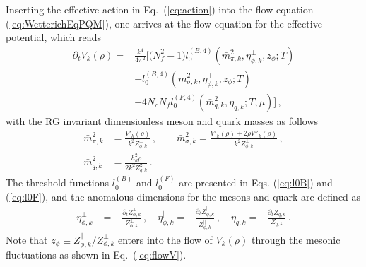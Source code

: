 \documentclass[%
reprint,
superscriptaddress,
showpacs,preprintnumbers,
 amsmath,amssymb,
 aps,
prd,
]{revtex4-1}
\def\Eq#1{Eq.~(\ref{#1})}
\def\eq#1{(\ref{#1})}
\begin{document}
Inserting the effective action in \Eq{eq:action} into the flow equation \eq{eq:WetterichEqPQM}, one arrives at the flow equation for the effective potential, which reads
\begin{align}
  \partial_t V_k(\rho)=&\frac{k^4}{4\pi^2} \bigg [\big(N^2_f-1\big) l^{(B,4)}_{0}(\bar{m}^{2}_{\pi,k},\eta^{\perp}_{\phi,k},z_\phi;T)\nonumber\\[2ex]
&+l^{(B,4)}_{0}(\bar{m}^{2}_{\sigma,k},\eta^{\perp}_{\phi,k},z_\phi;T)\nonumber\\[2ex]
&-4N_c N_f l^{(F,4)}_{0}(\bar{m}^{2}_{q,k},\eta_{q,k};T,\mu)\bigg]\,, \label{eq:flowV}
\end{align}
with the RG invariant dimensionless meson and quark masses as follows
\begin{align}
  \bar{m}^{2}_{\pi,k}&=\frac{V'_k(\rho)}{k^2Z^{\perp}_{\phi,k}}\,, \qquad \bar{m}^{2}_{\sigma,k}=\frac{V'_k(\rho)+2\rho V''_k(\rho)}{k^2 Z^{\perp}_{\phi,k}}\,,\\[2ex]
  \bar{m}^{2}_{q,k}&=\frac{h^{2}_{k}\rho}{2k^2Z^{2}_{q,k}}\,.
\end{align}
The threshold functions $l^{(B)}_{0}$ and $l^{(F)}_{0}$ are presented in Eqs. (\ref{eq:l0B}) and (\ref{eq:l0F}), and the anomalous dimensions for the mesons and quark are defined as
\begin{align}
  \eta_{\phi,k}^{\perp}&=-\frac{\partial_t Z_{\phi,k}^{\perp}}{Z_{\phi,k}^{\perp}}\,,\quad \eta_{\phi,k}^{\parallel}=-\frac{\partial_t Z_{\phi,k}^{\parallel}}{Z_{\phi,k}^{\parallel}}\,,\quad \eta_{q,k}=-\frac{\partial_t Z_{q,k}}{Z_{q,k}}\,. \label{}
\end{align}
Note that $z_\phi \equiv Z_{\phi,k}^{\parallel}/Z_{\phi,k}^{\perp}$ enters into the flow of $V_k(\rho)$ through the mesonic fluctuations as shown in \Eq{eq:flowV}. 
\end{document}
